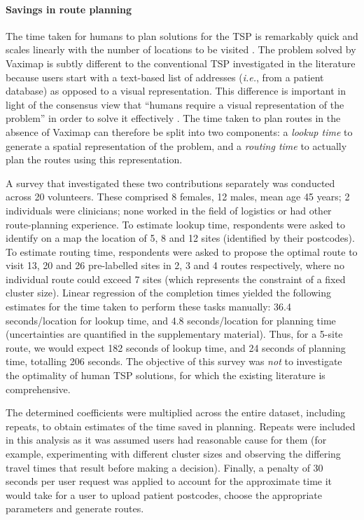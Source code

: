 \documentclass{article}
\def\vm{Vaximap}
\begin{document}
\paragraph{Savings in route planning}
The time taken for humans to plan solutions for the TSP is remarkably quick and scales linearly with the number of locations to be visited \cite{Macgregor1996, Dry2006, MacGregor2011}. The problem solved by \vm{} is subtly different to the conventional TSP investigated in the literature because users start with a text-based list of addresses (\textit{i.e.}, from a patient database) as opposed to a visual representation. This difference is important in light of the consensus view that ``humans require a visual representation of the problem'' in order to solve it effectively \cite{MacGregor2011}. The time taken to plan routes in the absence of \vm{} can therefore be split into two components: a \textit{lookup time} to generate a spatial representation of the problem, and a \textit{routing time} to actually plan the routes using this representation.

A survey that investigated these two contributions separately was conducted across 20 volunteers. These comprised 8 females, 12 males, mean age 45 years; 2 individuals were clinicians; none worked in the field of logistics or had other route-planning experience. To estimate lookup time, respondents were asked to identify on a map the location of 5, 8 and 12 sites (identified by their postcodes). To estimate routing time, respondents were asked to propose the optimal route to visit 13, 20 and 26 pre-labelled sites in 2, 3 and 4 routes respectively, where no individual route could exceed 7 sites (which represents the constraint of a fixed cluster size). Linear regression of the completion times yielded the following estimates for the time taken to perform these tasks manually: 36.4 seconds/location for lookup time, and 4.8 seconds/location for planning time (uncertainties are quantified in the supplementary material). Thus, for a 5-site route, we would expect 182 seconds of lookup time, and 24 seconds of planning time, totalling 206 seconds. The objective of this survey was \textit{not} to investigate the optimality of human TSP solutions, for which the existing literature is comprehensive. 

The determined coefficients were multiplied across the entire dataset, including repeats, to obtain estimates of the time saved in planning. Repeats were included in this analysis as it was assumed users had reasonable cause for them (for example, experimenting with different cluster sizes and observing the differing travel times that result before making a decision). Finally, a penalty of 30 seconds per user request was applied to account for the approximate time it would take for a user to upload patient postcodes, choose the appropriate parameters and generate routes. 
\end{document}
